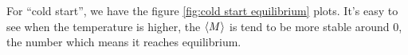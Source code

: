 \documentclass[12pt]{article}
\begin{document}
	For ``cold start'', we have the figure \ref{fig:cold start equilibrium} plots. It's easy to see when the temperature is higher, the $\braket{M}$ is tend to be more stable around 0, the number which means it reaches equilibrium.
	\begin{figure}[htb]
		\centering
		 \quad
		 \quad
		 \quad

\end{figure}
\end{document}
